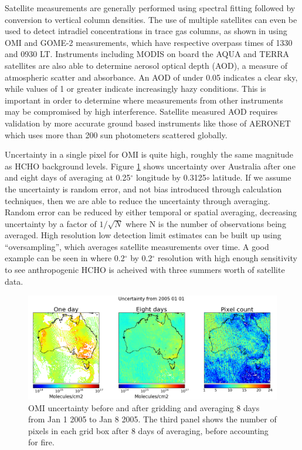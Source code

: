     Satellite measurements are generally performed using spectral fitting followed by conversion to vertical column densities.
    The use of multiple satellites can even be used to detect intradiel concentrations in trace gas columns, as shown in \cite{Stavrakou2015} using OMI and GOME-2 measurements, which have respective overpass times of 1330 and 0930 LT.
    Instruments including MODIS on board the AQUA and TERRA satellites are also able to determine aerosol optical depth (AOD), a measure of atmospheric scatter and absorbance. 
    An AOD of under 0.05 indicates a clear sky, while values of 1 or greater indicate increasingly hazy conditions.
    This is important in order to determine where measurements from other instruments may be compromised by high interference.
    Satellite measured AOD requires validation by more accurate ground based instruments like those of AERONET which uses more than 200 sun photometers scattered globally.
    
    Uncertainty in a single pixel for OMI is quite high, roughly the same magnitude as HCHO background levels.
    Figure \ref{Model:Meas:sat:fig_averagingUncertainty} shows uncertainty over Australia after one and eight days of averaging at 0.25$^{\circ}$ longitude by 0.3125${\circ}$ latitude.
    If we assume the uncertainty is random error, and not bias introduced through calculation techniques, then we are able to reduce the uncertainty through averaging.
    Random error can be reduced by either temporal or spatial averaging, decreasing uncertainty by a factor of $1/\sqrt{N}$ where N is the number of observations being averaged.
    High resolution low detection limit estimates can be built up using ``oversampling'', which averages satellite measurements over time.
    A good example can be seen in \cite{Zhu2014} where 0.2$^{\circ}$ by 0.2$^{\circ}$ resolution with high enough sensitivity to see anthropogenic HCHO is acheived with three summers worth of satellite data.
    
    
    \begin{figure}[!htbp]
      \includegraphics[width=\textwidth]{Figures/HCHO/Uncertainty.png}
      \caption{%
        OMI uncertainty before and after gridding and averaging 8 days from Jan 1 2005 to Jan 8 2005.
        The third panel shows the number of pixels in each grid box after 8 days of averaging, before accounting for fire.
      }
      \label{Model:Meas:sat:fig_averagingUncertainty}
    \end{figure}
    
